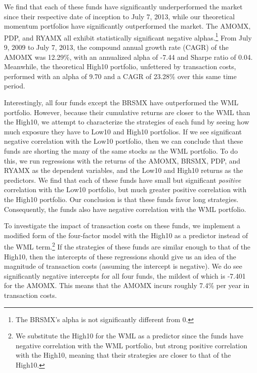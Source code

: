 \documentclass[12pt]{article}
\begin{document}
We find that each of these funds have significantly underperformed the market since their respective date of inception to July 7, 2013, while our theoretical momentum portfolios have significantly outperformed the market. The AMOMX, PDP, and RYAMX all exhibit statistically significant negative alphas.\footnote{The BRSMX's alpha is not significantly different from 0.} From July 9, 2009 to July 7, 2013, the compound annual growth rate (CAGR) of the AMOMX was 12.29\%, with an annualized alpha of -7.44 and Sharpe ratio of 0.04. Meanwhile, the theoretical High10 portfolio, unfettered by transaction costs, performed with an alpha of 9.70 and a CAGR of 23.28\% over this same time period. 

Interestingly, all four funds except the BRSMX have outperformed the WML portfolio. However, because their cumulative returns are closer to the WML than the High10, we attempt to characterize the strategies of each fund by seeing how much exposure they have to Low10 and High10 portfolios. If we see significant negative correlation with the Low10 portfolio, then we can conclude that these funds are shorting the many of the same stocks as the WML portfolio. To do this, we run regressions with the returns of the AMOMX, BRSMX, PDP, and RYAMX as the dependent variables, and the Low10 and High10 returns as the predictors. We find that each of these funds have small but significant \emph{positive} correlation with the Low10 portfolio, but much greater positive correlation with the High10 portfolio. Our conclusion is that these funds favor long strategies. Consequently, the funds also have negative correlation with the WML portfolio.

To investigate the impact of transaction costs on these funds, we implement a modified form of the four-factor model with the High10 as a predictor instead of the WML term.\footnote{We substitute the High10 for the WML as a predictor since the funds have negative correlation with the WML portfolio, but strong positive correlation with the High10, meaning that their strategies are closer to that of the High10.} If the strategies of these funds are similar enough to that of the High10, then the intercepts of these regressions should give us an idea of the magnitude of transaction costs (assuming the intercept is negative). We do see significantly negative intercepts for all four funds, the mildest of which is -7.401 for the AMOMX. This means that the AMOMX incurs roughly 7.4\% per year in transaction costs.
\end{document}
